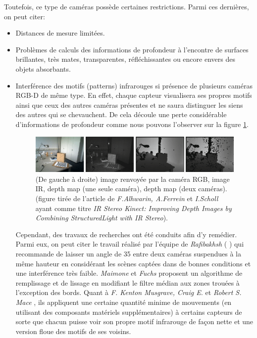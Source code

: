 \documentclass[a4paper, 12pt]{book}
\begin{document}
	\par Toutefois, ce type de caméras possède certaines restrictions. Parmi ces dernières, on peut citer:
	\begin{itemize}
		\item {Distances de mesure limitées.}	
		\item {Problèmes de calculs des informations de profondeur à l'encontre de surfaces brillantes, très mates, transparentes, réfléchissantes ou encore envers des objets absorbants.} 
		\item {Interférence des motifs (patterns) infrarouges si présence de plusieurs caméras RGB-D de même type. En effet, chaque capteur visualisera ses propres motifs ainsi que ceux des autres caméras présentes et ne saura distinguer les siens des autres qui se chevauchent.  De cela découle une perte considérable d'informations de profondeur comme nous pouvons l'observer sur la figure \ref{fig-interference}. 

\begin{figure}[htbp]
  \hspace{0.75cm}
 \includegraphics[scale=0.5]{images/interference.png}
  \caption{(De gauche à droite) image renvoyée par la caméra RGB, image IR, depth map (une seule caméra), depth map (deux caméras). (figure tirée de l'article de \emph{F.Alhwarin, A.Ferrein} et \emph{I.Scholl} ayant comme titre \emph{IR Stereo Kinect: Improving Depth Images by Combining StructuredLight with IR Stereo}).\label{fig-interference}}
\end{figure}

Cependant, des travaux de recherches ont été conduits afin d'y remédier. Parmi eux, on peut citer le travail réalisé par l'équipe de \emph{Rafibakhsh} ( \cite{RAFIBAKHSH15}) qui recommande de laisser un angle de 35\textdegree{} entre deux caméras suspendues à la même hauteur en considérant les scènes captées dans de bonnes conditions et une interférence très faible. \emph{Maimone} et \emph{Fuchs} \cite{MaimoneFuchs15} proposent un algorithme de remplissage et de lissage en modifiant le filtre médian aux zones trouées à l'exception des bords. Quant à \emph{F. Kenton Musgrave, Craig E.} et \emph{Robert S. Mace} \cite{KentonCraigMace12}, ils appliquent une certaine quantité minime de mouvements (en utilisant des composants matériels supplémentaires) à certains capteurs de sorte que chacun puisse voir son propre motif infrarouge de façon nette et une version floue des motifs de ses voisins. }
	\end{itemize}
\end{document}
